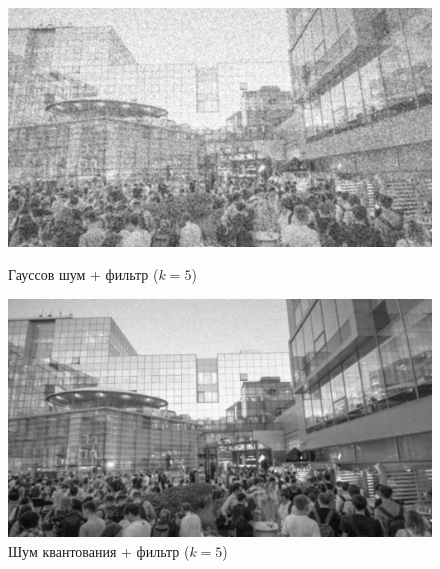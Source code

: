 \documentclass[a4paper]{article}
\begin{document}
\begin{figure}[H]
    \begin{minipage}{0.49\textwidth}
        \centering \includegraphics[width=\textwidth]{images/3_nonlinear_filters/gaussian - wiener (k=5).jpg}
        \caption{Гауссов шум + фильтр ($k = 5$)}
    \end{minipage}\hfill
    \begin{minipage}{0.49\textwidth}
        \centering \includegraphics[width=\textwidth]{images/3_nonlinear_filters/poisson - wiener (k=5).jpg}
        \caption{Шум квантования + фильтр ($k = 5$)}
    \end{minipage}
\end{figure}
\end{document}

